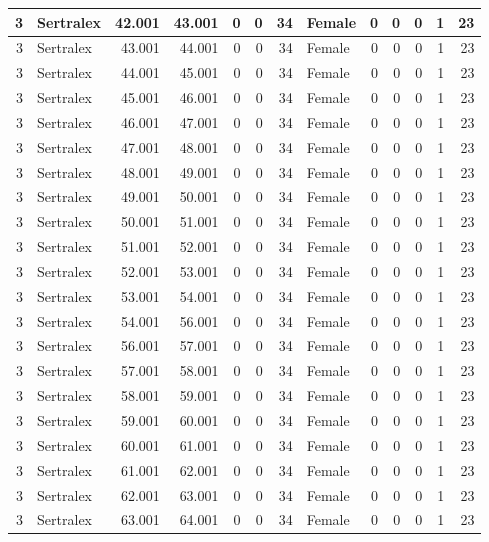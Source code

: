 \documentclass[
]{book}
\begin{document}
\begin{table}
\begin{tabular}[t]{r|l|r|r|r|r|r|l|r|r|r|r|r}
\hline
3 & Sertralex & 42.001 & 43.001 & 0 & 0 & 34 & Female & 0 & 0 & 0 & 1 & 23\\
\hline
3 & Sertralex & 43.001 & 44.001 & 0 & 0 & 34 & Female & 0 & 0 & 0 & 1 & 23\\
\hline
3 & Sertralex & 44.001 & 45.001 & 0 & 0 & 34 & Female & 0 & 0 & 0 & 1 & 23\\
\hline
3 & Sertralex & 45.001 & 46.001 & 0 & 0 & 34 & Female & 0 & 0 & 0 & 1 & 23\\
\hline
3 & Sertralex & 46.001 & 47.001 & 0 & 0 & 34 & Female & 0 & 0 & 0 & 1 & 23\\
\hline
3 & Sertralex & 47.001 & 48.001 & 0 & 0 & 34 & Female & 0 & 0 & 0 & 1 & 23\\
\hline
3 & Sertralex & 48.001 & 49.001 & 0 & 0 & 34 & Female & 0 & 0 & 0 & 1 & 23\\
\hline
3 & Sertralex & 49.001 & 50.001 & 0 & 0 & 34 & Female & 0 & 0 & 0 & 1 & 23\\
\hline
3 & Sertralex & 50.001 & 51.001 & 0 & 0 & 34 & Female & 0 & 0 & 0 & 1 & 23\\
\hline
3 & Sertralex & 51.001 & 52.001 & 0 & 0 & 34 & Female & 0 & 0 & 0 & 1 & 23\\
\hline
3 & Sertralex & 52.001 & 53.001 & 0 & 0 & 34 & Female & 0 & 0 & 0 & 1 & 23\\
\hline
3 & Sertralex & 53.001 & 54.001 & 0 & 0 & 34 & Female & 0 & 0 & 0 & 1 & 23\\
\hline
3 & Sertralex & 54.001 & 56.001 & 0 & 0 & 34 & Female & 0 & 0 & 0 & 1 & 23\\
\hline
3 & Sertralex & 56.001 & 57.001 & 0 & 0 & 34 & Female & 0 & 0 & 0 & 1 & 23\\
\hline
3 & Sertralex & 57.001 & 58.001 & 0 & 0 & 34 & Female & 0 & 0 & 0 & 1 & 23\\
\hline
3 & Sertralex & 58.001 & 59.001 & 0 & 0 & 34 & Female & 0 & 0 & 0 & 1 & 23\\
\hline
3 & Sertralex & 59.001 & 60.001 & 0 & 0 & 34 & Female & 0 & 0 & 0 & 1 & 23\\
\hline
3 & Sertralex & 60.001 & 61.001 & 0 & 0 & 34 & Female & 0 & 0 & 0 & 1 & 23\\
\hline
3 & Sertralex & 61.001 & 62.001 & 0 & 0 & 34 & Female & 0 & 0 & 0 & 1 & 23\\
\hline
3 & Sertralex & 62.001 & 63.001 & 0 & 0 & 34 & Female & 0 & 0 & 0 & 1 & 23\\
\hline
3 & Sertralex & 63.001 & 64.001 & 0 & 0 & 34 & Female & 0 & 0 & 0 & 1 & 23\\

\end{tabular}
\end{table}
\end{document}
